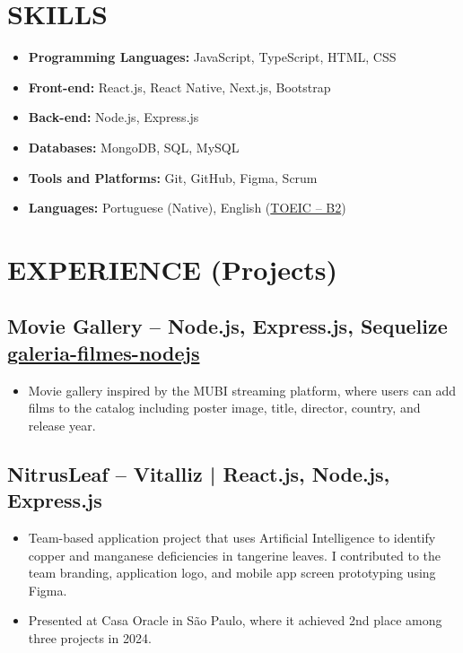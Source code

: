 \documentclass[a4paper,10pt]{article}
\begin{document}
\section{SKILLS}
    \begin{itemize}
        \item \textbf{Programming Languages:} JavaScript, TypeScript, HTML, CSS
        \item \textbf{Front-end:} React.js, React Native, Next.js, Bootstrap
        \item \textbf{Back-end:} Node.js, Express.js
        \item \textbf{Databases:} MongoDB, SQL, MySQL
        \item \textbf{Tools and Platforms:} Git, GitHub, Figma, Scrum
        \item \textbf{Languages:} Portuguese (Native), English (\href{https://drive.google.com/file/d/1wQA662aiYXgXoeTkIuQ1UzJLbKcqJmrU/view}{TOEIC – B2})
    \end{itemize}

\section{EXPERIENCE (Projects)}
    \subsection*{\texorpdfstring{
            \textbf{Movie Gallery – Node.js, Express.js, Sequelize} \hfill \href{https://github.com/amandafralve/galeria-filmes-nodejs}{galeria-filmes-nodejs}
        }{
            Project -- Location
        }}  
        \begin{itemize} 
            \item Movie gallery inspired by the MUBI streaming platform, where users can add films to the catalog including poster image, title, director, country, and release year.
        \end{itemize}
    
    \subsection*{\texorpdfstring{
            \textbf{NitrusLeaf – Vitalliz | React.js, Node.js, Express.js}
        }{
            Project -- Location
        }}  
        \begin{itemize} 
            \item Team-based application project that uses Artificial Intelligence to identify copper and manganese deficiencies in tangerine leaves. I contributed to the team branding, application logo, and mobile app screen prototyping using Figma.
            \item Presented at Casa Oracle in São Paulo, where it achieved 2nd place among three projects in 2024.
        \end{itemize}
\end{document}
